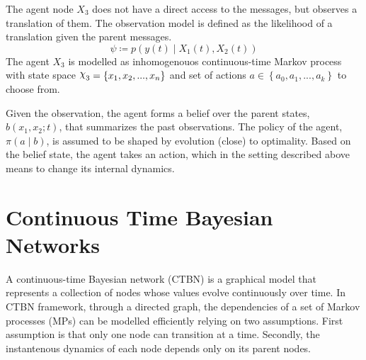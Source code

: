 The agent node $ X_3 $ does not have a direct access to the messages, but observes a translation of them. The observation model is defined as the likelihood of a translation given the parent messages.
\begin{equation}
\psi \coloneqq p(y(t) \mid X_{1}(t), X_{2}(t))
\end{equation}
The agent  $ X_{3} $ is modelled as inhomogenouos continuous-time Markov process with state space $ \rchi_{3} = \left\lbrace x_{1}, x_{2}, ..., x_{n} \right\rbrace  $ and set of actions $ a \in \left\lbrace a_{0}, a_{1}, ..., a_{k}\right\rbrace  $ to choose from. 

Given the observation, the agent forms a belief over the parent states, $  b(x_{1}, x_{2}; t) $, that summarizes the past observations.\cite{KAELBLING199899} The policy of the agent, $ \pi(a \mid b) $, is assumed to be shaped by evolution (close) to optimality. Based on the belief state, the agent takes an action, which in the setting described above means to change its internal dynamics. 
\section{Continuous Time Bayesian Networks}
A continuous-time Bayesian network (CTBN) is a graphical model that represents a collection of nodes whose values evolve continuously over time. In CTBN framework, through a directed graph, the dependencies of a set of Markov processes (MPs) can be modelled efficiently relying on two assumptions. First assumption is that only one node can transition at a time. Secondly, the instantenous dynamics of each node depends only on its parent nodes. \cite{Cohn2010a, Nodelman1995} 
